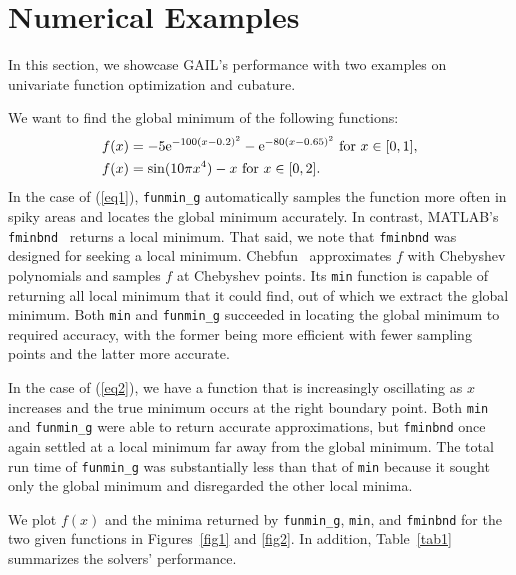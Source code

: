\section{Numerical Examples}
\label{sec:ex}

In this section, we showcase GAIL's performance with two examples on
univariate function optimization and cubature.

\begin{example}\label{eg1} We want to find the global minimum of the following functions: 
\begin{align}
    f(x) &= -5 \mathrm{e}^{-100(x-0.2)^2}-\mathrm{e}^{ -80(x-0.65)^2}  \mbox{ for } x \in [0, 1], \label{eq1}
\\  f(x) &= \sin (10 \pi x^4 ) - x  \mbox{ for } x \in [0, 2]. \label{eq2}
\end{align}
In the case of (\ref{eq1}), \texttt{funmin\_g} automatically samples the
function more often in spiky areas and locates the global minimum
accurately. In contrast, MATLAB's
\texttt{fminbnd}~\cite{brent2013algorithms,forsythe1977computer} returns a
local minimum.  That said, we note that \texttt{fminbnd} was designed for
seeking a local minimum. Chebfun~\cite{TrefEtal17a} approximates $f$ with
Chebyshev polynomials and samples $f$ at Chebyshev points. Its \texttt{min} function is 
capable of returning all local minimum that it
could find, out of which we extract the global minimum. Both \texttt{min} and
\texttt{funmin\_g} succeeded in locating the global minimum to required
accuracy, with the former being more efficient with fewer sampling points
and the latter more accurate.


In the case of (\ref{eq2}), we have a function that is increasingly
oscillating as $x$ increases and the true minimum occurs at the right
boundary point. Both \texttt{min} and \texttt{funmin\_g} were able to return  
accurate approximations, but \texttt{fminbnd} once again settled at a local
minimum far away from the global minimum. The total run time of
\texttt{funmin\_g} was substantially less than that of \texttt{min} because it
sought only the global minimum and disregarded the other local minima.

We plot $f(x)$ and the minima returned by \texttt{funmin\_g}, \texttt{min},
and \texttt{fminbnd}  for the two given functions in Figures~\ref{fig1} and
\ref{fig2}. In addition, Table~\ref{tab1} summarizes the solvers'
performance.


\end{example}
